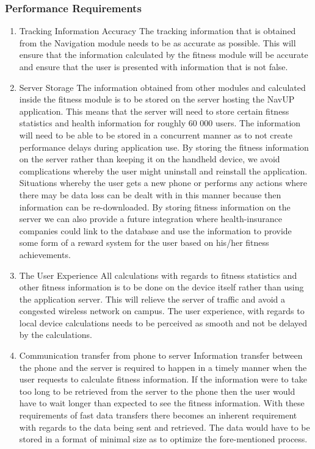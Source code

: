 \subsubsection{Performance Requirements}
\begin{enumerate}
	\item Tracking Information Accuracy
	\newline
	The tracking information that is obtained from the Navigation module needs to be as accurate as possible. This will ensure that the information calculated by the fitness module will be accurate and ensure that the user is presented with information that is not false.
	\item Server Storage
	\newline
	The information obtained from other modules and calculated inside the fitness module is to be stored on the server hosting the NavUP application. This means that the server will need to store certain fitness statistics and health information for roughly 60 000 users. The information will need to be able to be stored in a concurrent manner as to not create performance delays during application use.
	\newline
	By storing the fitness information on the server rather than keeping it on the handheld device, we avoid complications whereby the user might uninstall and reinstall the application. Situations whereby the user gets a new phone or performs any actions where there may be data loss can be dealt with in this manner because then information can be re-downloaded.  
	\newline
	By storing fitness information on the server we can also provide a future integration where health-insurance companies could link to the database and use the information to provide some form of a reward system for the user based on his/her fitness achievements.  
	
	\item The User Experience 
	\newline
	All calculations with regards to fitness statistics and other fitness information is to be done on the device itself rather than using the application server. This will relieve the server of traffic and avoid a congested wireless network on campus. The user experience, with regards to local device calculations needs to be perceived as smooth and not be delayed by the calculations.
	
	\item Communication transfer from phone to server
	\newline
	Information transfer between the phone and the server is required to happen in a timely manner when the user requests to calculate fitness information. If the information were to take too long to be retrieved from the server to the phone then the user would have to wait longer than expected to see the fitness information.
	\newline
	With these requirements of fast data transfers there becomes an inherent requirement with regards to the data being sent and retrieved. The data would have to be stored in a format of minimal size as to optimize the fore-mentioned process.
	

\end{enumerate}
